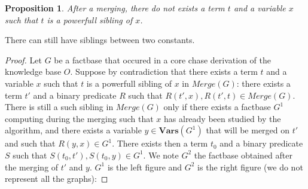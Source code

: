 \documentclass{article}
\newtheorem{proposition}{Proposition}[section]
\theoremstyle{definition}
\theoremstyle{remark}
\newcommand{\Vars}{\textbf{Vars}}
\newcommand{\Merge}{\textit{Merge}}
\begin{document}
\begin{proposition}
After a merging, there do not exists a term $t$ and a variable $x$ such that $t$ is a powerfull sibling of $x$.
\end{proposition}

There can still have siblings between two constants.

\begin{proof}
Let $G$ be a factbase that occured in a core chase derivation of the knowledge base $O$. 
Suppose by contradiction that there exists a term $t$ and a variable $x$ such that $t$ is a powerfull sibling of $x$ in $\Merge(G)$: there exists a term $t'$ and a binary predicate $R$ such that $R(t',x),R(t',t) \in \Merge(G)$. There is still a such sibling in $\Merge(G)$ only if there exists a factbase $G^1$ computing during the merging such that $x$ has already been studied by the algorithm, and there exists a variable $y \in \Vars(G^1)$ that will be merged on $t'$ and such that $R(y,x) \in G^1$. There exists then a term $t_0$ and a binary predicate $S$ such that $S(t_0,t'),S(t_0,y) \in G^1$. We note $G^2$ the factbase obtained after the merging of $t'$ and $y$. $G^1$ is the left figure and $G^2$ is the right figure (we do not represent all the graphs):


\end{proof}
\end{document}
